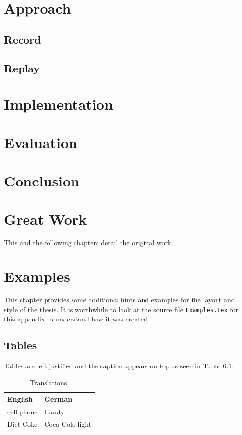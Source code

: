 \documentclass[11pt,a4paper]{book}
\begin{document}
\chapter{Approach}
\section{Record}
\section{Replay}

\chapter{Implementation}

\chapter{Evaluation}

\chapter{Conclusion}

\chapter{Great Work}
\label{s:GreatWork}

This and the following chapters detail the original work.

\chapter{Examples}
\label{s:Examples}

This chapter provides some additional hints and examples for the
layout and style of the thesis. It is worthwhile to look at the source
file \verb|Examples.tex| for this appendix to understand how it was
created.

\section{Tables}

Tables are left justified and the caption appears on top as seen in
Table~\ref{t:Translations}.

\begin{table}[ht]
\centering
\begin{tabular}{ll}
\hline
\textbf{English} & \textbf{German}\\
\hline
cell phone       & Handy\\
Diet Coke        & Coca Cola light\\
\hline
\end{tabular}
\caption[Translations]{\label{t:Translations}Translations.}
\end{table}
\end{document}
